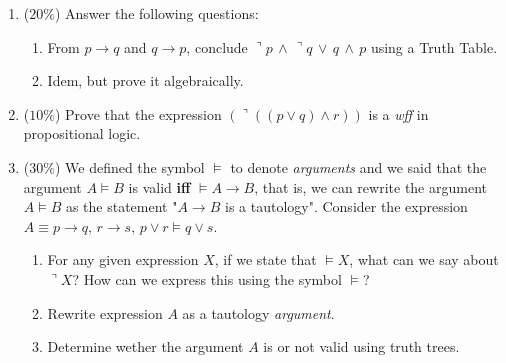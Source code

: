 \documentclass{article}
\begin{document}
\begin{enumerate}
\vspace{16cm}
\item ($20\%$)  Answer the following questions:
\begin{enumerate}
\item From $p\rightarrow q$ and $q\rightarrow p$, conclude $\urcorner p\,\wedge\,\urcorner q\,\vee\,q\,\wedge\, p$ using a Truth Table.
\item Idem, but prove it algebraically.
\end{enumerate}
\vspace{16cm}
\item ($10\%$) Prove that the expression $(\urcorner ((p\vee q)\wedge r))$ is a {\sl wff} in propositional logic.
\vspace{4cm}
\item ($30\%$) We defined the symbol $\vDash$ to denote {\sl arguments} and we said that the argument $A\vDash B$ is valid {\bf iff} $\vDash A\rightarrow B$, 
that is, we can rewrite the argument $A\vDash B$ as the statement "$A\rightarrow B$ is a tautology".
Consider the expression $A\equiv p\rightarrow q,\,r\rightarrow s,\,p\vee r\vDash q\vee s$.
\begin{enumerate}
\item For any given expression $X$, if we state that $\vDash X$, what can we say about $\urcorner X$? How can we express this using the symbol $\vDash$?
\item Rewrite expression $A$ as a tautology {\sl argument}.
\item Determine wether the argument $A$ is or not valid using truth trees.
\end{enumerate}

\end{enumerate}
\end{document}
